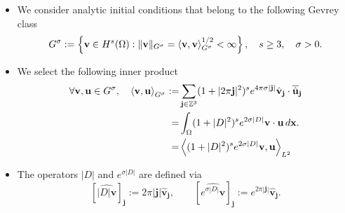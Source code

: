 \documentclass{beamer}
\def\Bmp#1{ \begin{minipage}{#1} }
\def\Emp{ \end{minipage} }
\newcommand{\la}{\left\langle}
\newcommand{\ra}{\right\rangle}
\newcommand{\lb}{\left\lbrace}
\newcommand{\rb}{\right\rbrace}
\def\ZZ{{\mathbb{Z}}}
\def\v{{\bf v}}
\def\x{{\bf x}}
\def\j{{\bf j}}
\def\u{{\bf u}}
\begin{document}
\frame
{
\hspace*{-1.0cm}
\Bmp{12cm}
\raggedright

\begin{itemize}
\item<1->
We consider analytic initial conditions that belong to the following Gevrey class
\small
\begin{equation*}\label{eq:Gevrey:Class}
G^\sigma := \lb \v\in H^s(\Omega) : \|\v\|_{G^\sigma} = \la \v,\v\ra_{G^\sigma}^{1/2}<\infty \rb, \quad s\geq 3, \quad \sigma > 0.
\end{equation*}

\item<2->
We select the following inner product
\begin{subequations}\label{eq:Gevrey:Inner:Product}
\begin{align*}
\forall \v,\u \in G^\sigma, \quad \la \v,\u \ra_{G^\sigma} :=& \sum_{\j\in \ZZ^3} (1+|2\pi \j|^2)^se^{4\pi\sigma|\j|}\hat{\v}_{\j}\cdot \overline{\hat{\u}}_{\j} \\
=& \int_{\Omega}(1+|D|^2)^se^{2\sigma |D|}\v\cdot \u \, d\x. \\
=& \la (1+|D|^2)^se^{2\sigma|D|}\v,\u\ra_{L^2}
\end{align*}
\end{subequations}

\item<3->
The operators $|D|$ and $e^{\sigma|D|}$ are defined via
\begin{equation*}\label{eq:D}
\left[ \widehat{|D|\boldsymbol v} \right]_{\boldsymbol j} := 2\pi|\boldsymbol j|\boldsymbol{\hat{v}_j}, \qquad \left[ \widehat{e^{\sigma |D|}\boldsymbol v} \right]_{\boldsymbol j} := e^{2\pi|\boldsymbol j|}\boldsymbol{\hat{v}_j}.
\end{equation*}

\end{itemize}
\Emp
}
\end{document}

